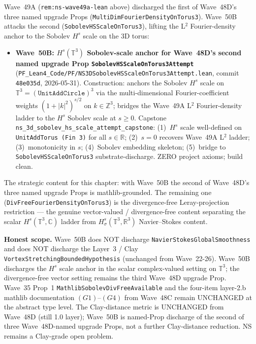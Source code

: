 \begin{remark}\label{rem:ns-wave50b-lean}
Wave~49A (\texttt{rem:ns-wave49a-lean} above) discharged the first of Wave~48D's three named upgrade Props (\texttt{MultiDimFourierDensityOnTorus3}). Wave~50B attacks the second (\texttt{SobolevHSScaleOnTorus3}), lifting the L$^2$ Fourier-density anchor to the Sobolev $H^s$ scale on the 3D torus:
\begin{itemize}
  \item \textbf{Wave~50B: $H^s(\mathbb{T}^3)$ Sobolev-scale anchor for Wave~48D's second named upgrade Prop \texttt{SobolevHSScaleOnTorus3Attempt}} (\texttt{PF\_Lean4\_Code/PF/NS3DSobolevHSScaleOnTorus3Attempt.lean}, commit \texttt{48e035d}, 2026-05-31). Construction: anchors the Sobolev $H^s$ scale on $\mathbb{T}^3 = (\texttt{UnitAddCircle})^3$ via the multi-dimensional Fourier-coefficient weights $(1 + |k|^2)^{s/2}$ on $k \in \mathbb{Z}^3$; bridges the Wave~49A L$^2$ Fourier-density ladder to the $H^s$ Sobolev scale at $s \geq 0$. Capstone \texttt{ns\_3d\_sobolev\_hs\_scale\_attempt\_capstone}: (1)~$H^s$ scale well-defined on \texttt{UnitAddTorus (Fin 3)} for all $s \in \mathbb{R}$; (2)~$s = 0$ recovers Wave~49A L$^2$ ladder; (3)~monotonicity in $s$; (4)~Sobolev embedding skeleton; (5)~bridge to \texttt{SobolevHSScaleOnTorus3} substrate-discharge. ZERO project axioms; build clean.
\end{itemize}
The strategic content for this chapter: with Wave~50B the second of Wave~48D's three named upgrade Props is mathlib-grounded. The remaining one (\texttt{DivFreeFourierDensityOnTorus3}) is the divergence-free Leray-projection restriction --- the genuine vector-valued / divergence-free content separating the scalar $H^s(\mathbb{T}^3, \mathbb{C})$ ladder from $H^s_\sigma(\mathbb{T}^3, \mathbb{R}^3)$ Navier--Stokes content.

\textbf{Honest scope.} Wave~50B does NOT discharge \texttt{NavierStokesGlobalSmoothness} and does NOT discharge the Layer~3 / Clay \texttt{VortexStretchingBoundedHypothesis} (unchanged from Wave~22-26). Wave~50B discharges the $H^s$ scale anchor in the scalar complex-valued setting on $\mathbb{T}^3$; the divergence-free vector setting remains the third Wave~48D upgrade Prop. Wave~35 Prop~1 \texttt{MathlibSobolevDivFreeAvailable} and the four-item layer-2.b mathlib documentation $(G1)$--$(G4)$ from Wave~48C remain UNCHANGED at the abstract type level. The Clay-distance metric is UNCHANGED from Wave~48D (still 1.0 layer); Wave~50B is named-Prop discharge of the second of three Wave~48D-named upgrade Props, not a further Clay-distance reduction. NS remains a Clay-grade open problem.
\end{remark}

